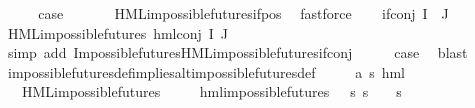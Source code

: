 \begin{isabellebody}
\ \ \isamarkupfalse%
\ \isamarkupfalse%
\ {\isacharquery}{\kern0pt}case\ \isanewline
\ \ \ \ \isamarkupfalse%
\ HML{\isacharunderscore}{\kern0pt}impossible{\isacharunderscore}{\kern0pt}futures{\isachardot}{\kern0pt}if{\isacharunderscore}{\kern0pt}pos\ \isamarkupfalse%
\ fastforce\isanewline
{}\isamarkupfalse%
\isanewline
\ \ \isamarkupfalse%
\ {\isacharparenleft}{\kern0pt}if{\isacharunderscore}{\kern0pt}conj\ I\ {\isasymPhi}\ J{\isacharparenright}{\kern0pt}\isanewline
\ \ \isamarkupfalse%
\ {\isachardoublequoteopen}HML{\isacharunderscore}{\kern0pt}impossible{\isacharunderscore}{\kern0pt}futures\ {\isacharparenleft}{\kern0pt}hml{\isacharunderscore}{\kern0pt}conj\ I\ J\ {\isasymPhi}{\isacharparenright}{\kern0pt}{\isachardoublequoteclose}\ \isanewline
\ \ \ \ \isamarkupfalse%
\ {\isacharparenleft}{\kern0pt}simp\ add{\isacharcolon}{\kern0pt}\ Impossible{\isacharunderscore}{\kern0pt}futures{\isachardot}{\kern0pt}HML{\isacharunderscore}{\kern0pt}impossible{\isacharunderscore}{\kern0pt}futures{\isachardot}{\kern0pt}if{\isacharunderscore}{\kern0pt}conj{\isacharparenright}{\kern0pt}\isanewline
\ \ \isamarkupfalse%
\ \isamarkupfalse%
\ {\isacharquery}{\kern0pt}case\ \isamarkupfalse%
\ blast\isanewline
{}\isamarkupfalse%
%
\endisatagproof
{\isafoldproof}%
%
\isadelimproof
\isanewline
%
\endisadelimproof
\isanewline
{}\isamarkupfalse%
\ impossible{\isacharunderscore}{\kern0pt}futures{\isacharunderscore}{\kern0pt}def{\isacharunderscore}{\kern0pt}implies{\isacharunderscore}{\kern0pt}alt{\isacharunderscore}{\kern0pt}impossible{\isacharunderscore}{\kern0pt}futures{\isacharunderscore}{\kern0pt}def{\isacharcolon}{\kern0pt}\isanewline
\ \ \ {\isasymphi}\ {\isacharcolon}{\kern0pt}{\isacharcolon}{\kern0pt}\ {\isachardoublequoteopen}{\isacharparenleft}{\kern0pt}{\isacharprime}{\kern0pt}a{\isacharcomma}{\kern0pt}\ {\isacharprime}{\kern0pt}s{\isacharparenright}{\kern0pt}\ hml{\isachardoublequoteclose}\isanewline
\ \ \ {\isachardoublequoteopen}HML{\isacharunderscore}{\kern0pt}impossible{\isacharunderscore}{\kern0pt}futures\ {\isasymphi}{\isachardoublequoteclose}\isanewline
\ \ \ {\isachardoublequoteopen}{\isasymexists}{\isasympsi}{\isachardot}{\kern0pt}\ hml{\isacharunderscore}{\kern0pt}impossible{\isacharunderscore}{\kern0pt}futures\ {\isasympsi}\ {\isasymand}\ {\isacharparenleft}{\kern0pt}{\isasymforall}s{\isachardot}{\kern0pt}\ {\isacharparenleft}{\kern0pt}s\ {\isasymTurnstile}\ {\isasymphi}{\isacharparenright}{\kern0pt}\ {\isasymlongleftrightarrow}\ {\isacharparenleft}{\kern0pt}s\ {\isasymTurnstile}\ {\isasympsi}{\isacharparenright}{\kern0pt}{\isacharparenright}{\kern0pt}{\isachardoublequoteclose}\isanewline

\end{isabellebody}
